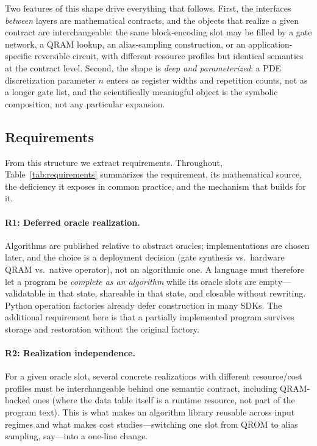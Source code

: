 Two features of this shape drive everything that follows.  First, the
interfaces \emph{between} layers are mathematical contracts, and the objects
that realize a given contract are interchangeable: the same block-encoding
slot may be filled by a gate network, a QRAM lookup, an alias-sampling
construction, or an application-specific reversible circuit, with different
resource profiles but identical semantics at the contract level.  Second, the
shape is \emph{deep and parameterized}: a PDE discretization parameter $n$
enters as register widths and repetition counts, not as a longer gate list,
and the scientifically meaningful object is the symbolic composition, not any
particular expansion.

\subsection{Requirements}
\label{sec:qsc-requirements}

From this structure we extract requirements.  Throughout,
Table~\ref{tab:requirements} summarizes the requirement, its mathematical
source, the deficiency it exposes in common practice, and the mechanism that
\pqlang{} builds for it.

\paragraph{R1: Deferred oracle realization.}
Algorithms are published relative to abstract oracles; implementations are
chosen later, and the choice is a deployment decision (gate synthesis
vs.\ hardware QRAM vs.\ native operator), not an algorithmic one.  A language
must therefore let a program be \emph{complete as an algorithm} while its
oracle slots are empty---validatable in that state, shareable in that state,
and closable without rewriting.  Python operation factories already defer construction in many SDKs.
The additional requirement here is that a partially implemented program
survives storage and restoration without the original factory.

\paragraph{R2: Realization independence.}
For a given oracle slot, several concrete realizations with different
resource/cost profiles must be interchangeable behind one semantic contract,
including QRAM-backed ones (where the data table itself is a runtime
resource, not part of the program text).  This is what makes an algorithm
library reusable across input regimes and what makes cost studies---switching
one slot from QROM to alias sampling, say---into a one-line change.

